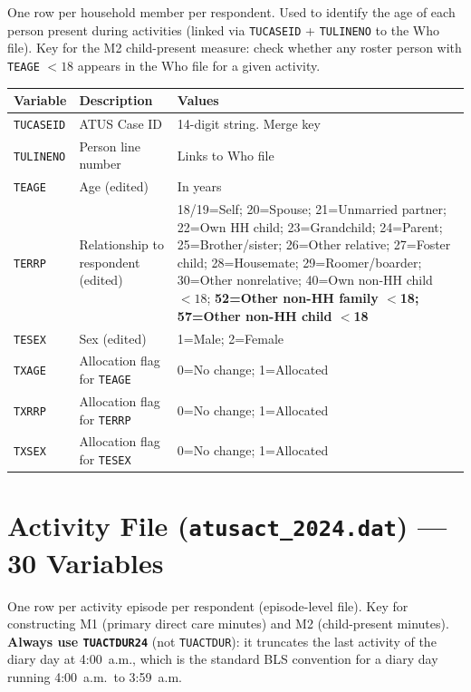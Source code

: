 \documentclass[11pt, a4paper]{article}
\begin{document}
\begin{tcolorbox}[notebox]
One row per household member per respondent. Used to identify the age of each
person present during activities (linked via \texttt{TUCASEID} +
\texttt{TULINENO} to the Who file). Key for the M2 child-present measure:
check whether any roster person with \texttt{TEAGE} $< 18$ appears in the Who
file for a given activity.
\end{tcolorbox}

\vspace{1mm}
\begin{longtable}{L{3cm} L{4.7cm} L{7.5cm}}
\toprule
\textbf{Variable} & \textbf{Description} & \textbf{Values} \\
\midrule \endhead \bottomrule \endfoot
\texttt{TUCASEID}  & ATUS Case ID & 14-digit string. Merge key \\
 \texttt{TULINENO}  & Person line number & Links to Who file \\
\texttt{TEAGE}     & Age (edited) & In years \\
 \texttt{TERRP}     & Relationship to respondent (edited) &
  18/19=Self; 20=Spouse; 21=Unmarried partner; 22=Own HH child;
  23=Grandchild; 24=Parent; 25=Brother/sister; 26=Other relative;
  27=Foster child; 28=Housemate; 29=Roomer/boarder; 30=Other nonrelative;
  40=Own non-HH child $<18$; \textbf{52=Other non-HH family $<$18;
  57=Other non-HH child $<$18} \\
\texttt{TESEX}     & Sex (edited) & 1=Male; 2=Female \\
 \texttt{TXAGE}     & Allocation flag for \texttt{TEAGE}  & 0=No change; 1=Allocated \\
\texttt{TXRRP}     & Allocation flag for \texttt{TERRP}  & 0=No change; 1=Allocated \\
 \texttt{TXSEX}     & Allocation flag for \texttt{TESEX}  & 0=No change; 1=Allocated \\
\end{longtable}

\newpage
\section{Activity File (\texttt{atusact\_2024.dat}) --- 30 Variables}

\begin{tcolorbox}[notebox]
One row per activity episode per respondent (episode-level file).
Key for constructing M1 (primary direct care minutes) and M2 (child-present
minutes). \textbf{Always use \texttt{TUACTDUR24}} (not \texttt{TUACTDUR}):
it truncates the last activity of the diary day at 4:00~a.m., which is the
standard BLS convention for a diary day running 4:00~a.m.\ to 3:59~a.m.
\end{tcolorbox}
\end{document}
